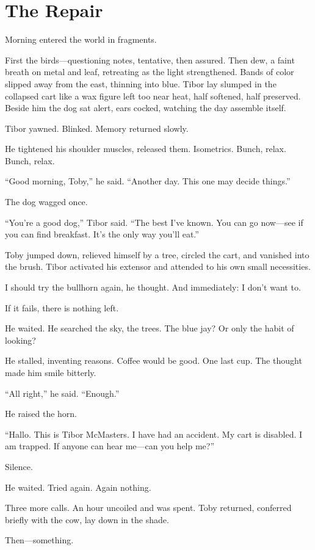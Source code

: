 \chapter{The Repair}

Morning entered the world in fragments.

First the birds—questioning notes, tentative, then assured. Then dew, a faint breath on metal and leaf, retreating as the light strengthened. Bands of color slipped away from the east, thinning into blue. Tibor lay slumped in the collapsed cart like a wax figure left too near heat, half softened, half preserved. Beside him the dog sat alert, ears cocked, watching the day assemble itself.

Tibor yawned. Blinked. Memory returned slowly.

He tightened his shoulder muscles, released them. Isometrics. Bunch, relax. Bunch, relax.

“Good morning, Toby,” he said. “Another day. This one may decide things.”

The dog wagged once.

“You’re a good dog,” Tibor said. “The best I’ve known. You can go now—see if you can find breakfast. It’s the only way you’ll eat.”

Toby jumped down, relieved himself by a tree, circled the cart, and vanished into the brush. Tibor activated his extensor and attended to his own small necessities.

I should try the bullhorn again, he thought. And immediately: I don’t want to.

If it fails, there is nothing left.

He waited. He searched the sky, the trees. The blue jay? Or only the habit of looking?

He stalled, inventing reasons. Coffee would be good. One last cup. The thought made him smile bitterly.

“All right,” he said. “Enough.”

He raised the horn.

“Hallo. This is Tibor McMasters. I have had an accident. My cart is disabled. I am trapped. If anyone can hear me—can you help me?”

Silence.

He waited. Tried again. Again nothing.

Three more calls. An hour uncoiled and was spent. Toby returned, conferred briefly with the cow, lay down in the shade.

Then—something.

